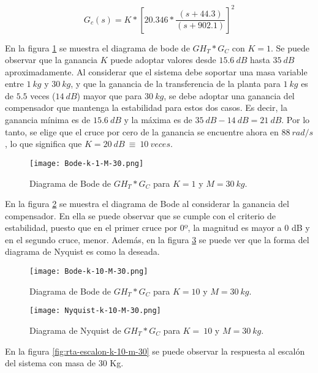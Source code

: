 \begin{equation}  
	G_c(s)=K*{[20.346*\frac{(s+44.3)}{(s+902.1)}]}^2
\end{equation} 

\noindent En la figura \ref{fig:bode-analog-compensado-para-k-1} se muestra el diagrama de bode de ${GH}_T*G_C$ con $K=1$. Se puede observar que la ganancia $K$ puede adoptar valores desde $15.6\:dB$ hasta $35\:dB$ aproximadamente. Al considerar que el sistema debe soportar una masa variable entre $1\:kg$ y $30\:kg$, y que la ganancia de la transferencia de la planta para $1\:kg$ es de $5.5$ veces ($14\:dB$) mayor que para $30\:kg$, se debe adoptar una ganancia del compensador que mantenga la estabilidad para estos dos casos. Es decir, la ganancia m\'{i}nima es de $15.6\:dB$ y la m\'{a}xima es de $35\:dB - 14\:dB = 21\:dB$. Por lo tanto, se elige que el cruce por cero de la ganancia se encuentre ahora en $88\:rad/s$, lo que significa que $K=20\:dB\ \equiv \ 10\: veces$.


\begin{figure}[H]
	\centering
	\texttt{[image: Bode-k-1-M-30.png]}
	\caption{Diagrama de Bode de $GH_T*G_C$ para $K=1$ y $M=30\:kg$.}
	\label{fig:bode-analog-compensado-para-k-1}
\end{figure}

\noindent En la figura \ref{fig:bode-analog-compensado-para-k-10} se muestra el diagrama de Bode al considerar la ganancia del compensador. En ella se puede observar que se  cumple con el criterio de estabilidad, puesto que en el primer cruce por 0º, la magnitud es mayor a 0 dB y en el segundo cruce, menor. Adem\'{a}s, en la figura \ref{fig:nyquist-analog-para-k-10} se puede ver que la forma del diagrama de Nyquist es como la deseada.

\begin{figure}[H]
	\centering
	\texttt{[image: Bode-k-10-M-30.png]}
	\caption{Diagrama de Bode de $GH_{T}*G_C$ para $K=10$ y $M=30\:kg$.}
	\label{fig:bode-analog-compensado-para-k-10}
\end{figure}

\begin{figure}[H]
	\centering
	\texttt{[image: Nyquist-k-10-M-30.png]}
	\caption{Diagrama de Nyquist de $GH_T*G_C$ para $K=\:10$ y $M=30\:kg$.}
	\label{fig:nyquist-analog-para-k-10}
\end{figure}

\noindent En la figura \ref{fig:rta-escalon-k-10-m-30} se puede observar la respuesta al escalón del sistema con masa de 30 Kg.

